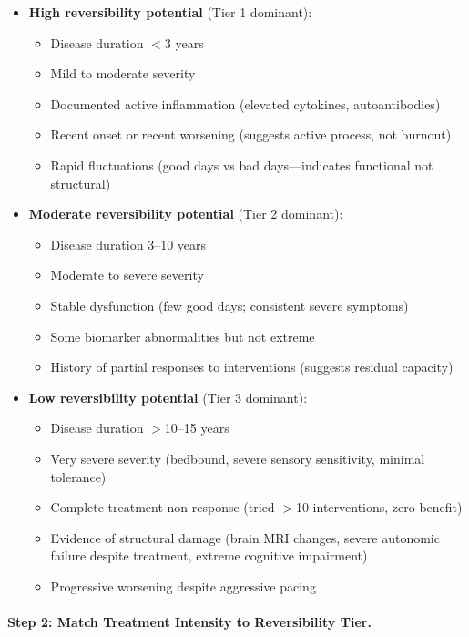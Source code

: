 \begin{itemize}
    \item \textbf{High reversibility potential} (Tier 1 dominant):
    \begin{itemize}
        \item Disease duration $<$3 years
        \item Mild to moderate severity
        \item Documented active inflammation (elevated cytokines, autoantibodies)
        \item Recent onset or recent worsening (suggests active process, not burnout)
        \item Rapid fluctuations (good days vs bad days—indicates functional not structural)
    \end{itemize}

    \item \textbf{Moderate reversibility potential} (Tier 2 dominant):
    \begin{itemize}
        \item Disease duration 3--10 years
        \item Moderate to severe severity
        \item Stable dysfunction (few good days; consistent severe symptoms)
        \item Some biomarker abnormalities but not extreme
        \item History of partial responses to interventions (suggests residual capacity)
    \end{itemize}

    \item \textbf{Low reversibility potential} (Tier 3 dominant):
    \begin{itemize}
        \item Disease duration $>$10--15 years
        \item Very severe severity (bedbound, severe sensory sensitivity, minimal tolerance)
        \item Complete treatment non-response (tried $>$10 interventions, zero benefit)
        \item Evidence of structural damage (brain MRI changes, severe autonomic failure despite treatment, extreme cognitive impairment)
        \item Progressive worsening despite aggressive pacing
    \end{itemize}
\end{itemize}

\paragraph{Step 2: Match Treatment Intensity to Reversibility Tier.}

